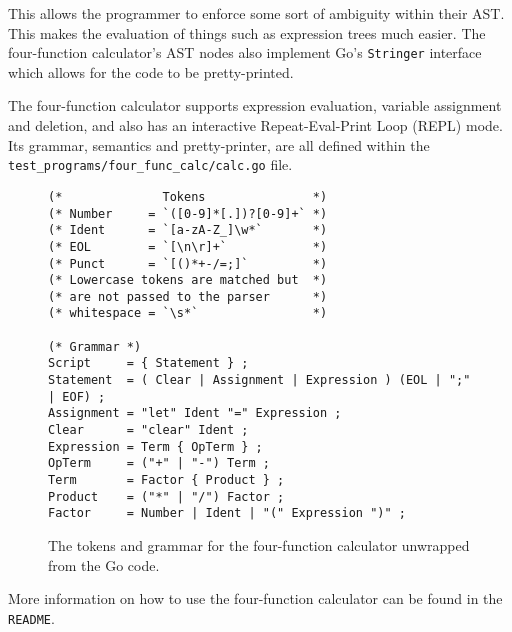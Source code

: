 This allows the programmer to enforce some sort of ambiguity within their AST. This makes the evaluation of things such as expression trees much easier. The four-function calculator's AST nodes also implement Go's \texttt{Stringer} interface which allows for the code to be pretty-printed.

The four-function calculator supports expression evaluation, variable assignment and deletion, and also has an interactive Repeat-Eval-Print Loop (REPL) mode. Its grammar, semantics and pretty-printer, are all defined within the \verb|test_programs/four_func_calc/calc.go| file.

\begin{figure}[H]
    \begin{verbatim}
(*              Tokens               *)
(* Number     = `([0-9]*[.])?[0-9]+` *)
(* Ident      = `[a-zA-Z_]\w*`       *)
(* EOL        = `[\n\r]+`            *)
(* Punct      = `[()*+-/=;]`         *)
(* Lowercase tokens are matched but  *)
(* are not passed to the parser      *)
(* whitespace = `\s*`                *)

(* Grammar *)
Script     = { Statement } ;
Statement  = ( Clear | Assignment | Expression ) (EOL | ";" | EOF) ;
Assignment = "let" Ident "=" Expression ;
Clear      = "clear" Ident ;
Expression = Term { OpTerm } ;
OpTerm     = ("+" | "-") Term ;
Term       = Factor { Product } ;
Product    = ("*" | "/") Factor ;
Factor     = Number | Ident | "(" Expression ")" ;
    \end{verbatim}
    \cprotect\caption{The tokens and grammar for the four-function calculator unwrapped from the Go code.}
\end{figure}

More information on how to use the four-function calculator can be found in the \verb|README|.
